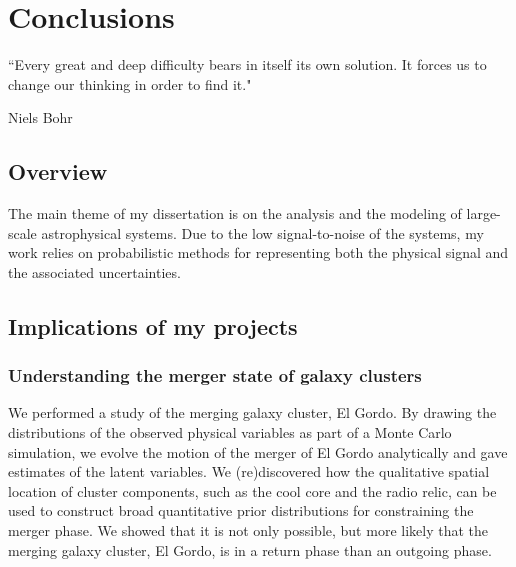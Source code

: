 \doublespacing

\setcounter{chapter}{4}
\chapter{Conclusions}{}{}
\label{chapter5}

\epigraph{``Every great and deep difficulty bears in itself its own solution. It forces
us to change our thinking in order to find it."}{Niels Bohr}

\section{Overview}
The main theme of my dissertation is on the analysis and the modeling of
large-scale astrophysical systems. 
Due to the low signal-to-noise of the systems, my work relies on probabilistic
methods for representing both the physical signal and the associated uncertainties. 

\section{Implications of my projects}
\subsection{Understanding the merger state of galaxy clusters}
We performed a study of the merging galaxy cluster, El Gordo. 
By drawing the distributions of the observed
physical variables as part of a Monte Carlo simulation, 
we evolve the motion of the merger of El Gordo analytically
and gave estimates of the latent variables. 
We (re)discovered how the qualitative spatial location 
of cluster components, such as the cool core 
and the radio relic, can be used to construct   
broad quantitative prior distributions for 
constraining the merger phase.  
We showed that it is not only possible, 
but more likely that the merging galaxy cluster, El Gordo, is in a return phase
than an outgoing phase. 
 
